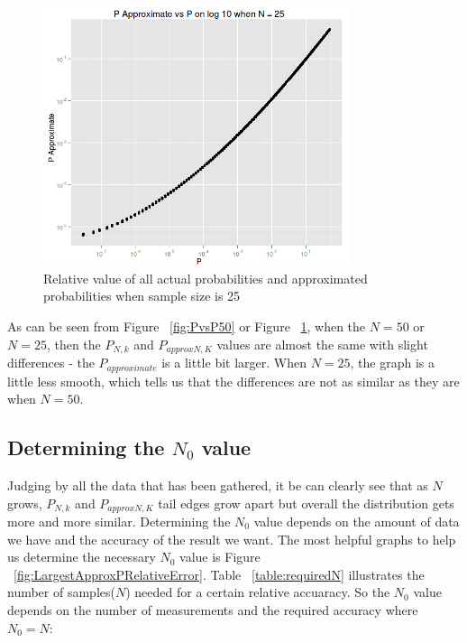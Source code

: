 \documentclass[12pt]{article}
\begin{document}
\begin{figure}
	\centering
  \includegraphics[width=0.8\textwidth]{PvsP25}
	\caption{Relative value of all actual probabilities and approximated probabilities when sample size is 25}
	\label{fig:PvsP25}
\end{figure}

As can be seen from Figure ~\ref{fig:PvsP50} or Figure ~\ref{fig:PvsP25}, when the $N = 50$ or $N = 25$, then the $P_{N, k}$ and $P_{approx N, K}$ values are almost the same with slight differences - the $P_{approximate}$ is a little bit larger. When $N = 25$, the graph is a little less smooth, which tells us that the differences are not as similar as they are when $N = 50$.

\subsection{Determining the $N_0$ value}
Judging by all the data that has been gathered, it be can clearly see that as $N$ grows, $P_{N, k}$ and $P_{approx N, K}$ tail edges grow apart but overall the distribution gets more and more similar. Determining the $N_0$ value depends on the amount of data we have and the accuracy of the result we want. The most helpful graphs to help us determine the necessary $N_0$ value is Figure ~\ref{fig:LargestApproxPRelativeError}. Table ~\ref{table:requiredN} illustrates the number of samples($N$) needed for a certain relative accuaracy. So the $N_0$ value depends on the number of measurements and the required accuracy where $N_0 = N$:
\end{document}
